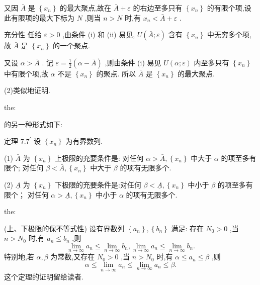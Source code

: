 又因 \(\bar{A}\) 是 \(\left\{  {x}_{n}\right\}\) 的最大聚点,故在 \(\bar{A} + \varepsilon\) 的右边至多只有 \(\left\{  {x}_{n}\right\}\) 的有限个项,设此有限项的最大下标为 \(N\) ,则当 \(n > N\) 时,有 \({x}_{n} < \bar{A} + \varepsilon\) .

充分性 任给 \(\varepsilon  > 0\) ,由条件 (i) 和 (ii) 易见, \(U\left( {\bar{A};\varepsilon }\right)\) 含有 \(\left\{  {x}_{n}\right\}\) 中无穷多个项,故 \(\bar{A}\) 是 \(\left\{  {x}_{n}\right\}\) 的一个聚点.

又设 \(\alpha  > \bar{A}\) . 记 \(\varepsilon  = \frac{1}{2}\left( {\alpha  - \bar{A}}\right)\) ,则由条件 (i) 易见 \(U\left( {\alpha ;\varepsilon }\right)\) 内至多只有 \(\left\{  {x}_{n}\right\}\) 中有限个项,故 \(\alpha\) 不是 \(\left\{  {x}_{n}\right\}\) 的聚点. 所以 \(\bar{A}\) 是 \(\left\{  {x}_{n}\right\}\) 的最大聚点.

(2)类似地证明.

\begin{theorem}{}{the:}

\end{theorem}
 的另一种形式如下:

定理 \({7.7}^{\prime }\) 设 \(\left\{  {x}_{n}\right\}\) 为有界数列.

(1) \(\bar{A}\) 为 \(\left\{  {x}_{n}\right\}\) 上极限的充要条件是: 对任何 \(\alpha  > \bar{A},\left\{  {x}_{n}\right\}\) 中大于 \(\alpha\) 的项至多有限个; 对任何 \(\beta  < \bar{A},\left\{  {x}_{n}\right\}\) 中大于 \(\beta\) 的项有无限多个.

(2) \(\underline{A}\) 为 \(\left\{  {x}_{n}\right\}\) 下极限的充要条件是:对任何 \(\beta  < \underline{A},\left\{  {x}_{n}\right\}\) 中小于 \(\beta\) 的项至多有限个； 对任何 \(\alpha  > \underline{A},\left\{  {x}_{n}\right\}\) 中小于 \(\alpha\) 的项有无限多个.

\begin{theorem}{}{the:}

\end{theorem}
(上、下极限的保不等式性) 设有界数列 \(\left\{  {a}_{n}\right\}  ,\left\{  {b}_{n}\right\}\) 满足: 存在 \({N}_{0} > 0\) ,当 \(n > {N}_{0}\) 时,有 \({a}_{n} \leq  {b}_{n}\) ,则
\[
\mathop{\lim }\limits_{{n \rightarrow  \infty }}{a}_{n} \leq  \mathop{\lim }\limits_{{n \rightarrow  \infty }}{b}_{n},\mathop{\lim }\limits_{{n \rightarrow  \infty }}{a}_{n} \leq  \mathop{\lim }\limits_{{n \rightarrow  \infty }}{b}_{n}.
\]
特别地,若 \(\alpha ,\beta\) 为常数,又存在 \({N}_{0} > 0\) ,当 \(n > {N}_{0}\) 时,有 \(\alpha  \leq  {a}_{n} \leq  \beta\) ,则
\[
\alpha  \leq  \mathop{\lim }\limits_{\overline{n \rightarrow  \infty }}{a}_{n} \leq  \mathop{\lim }\limits_{{n \rightarrow  \infty }}{a}_{n} \leq  \beta .
\]
这个定理的证明留给读者.

